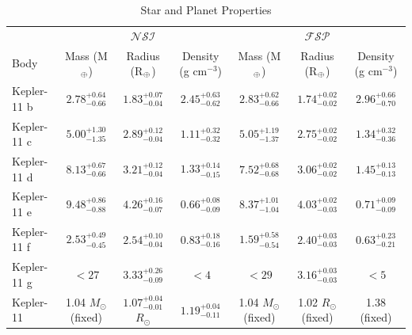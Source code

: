\documentclass[twocolumn,trackchanges]{aastex61}
\begin{document}
\begin{table}
\caption{Star and Planet Properties}
\label{table:den}
\centering 
\begin{tabular}{l | c c c | c c c} 
\hline
 & & $\mathcal{NSI}$ & & & $\mathcal{FSP}$ &  \\
Body & Mass (M$_\oplus$) & Radius (R$_\oplus$) & Density (g cm$^{-3}$) & Mass (M$_\oplus$) & Radius (R$_\oplus$) & Density (g cm$^{-3}$) \\
\hline
Kepler-11 b & $2.78^{+0.64}_{-0.66}$ & $1.83^{+0.07}_{-0.04} $ & $2.45^{+0.63}_{-0.62} $ & $2.83^{+0.62}_{-0.66}$ & $1.74^{+0.02}_{-0.02}$ & $ 2.96^{+0.66}_{-0.70} $  \\
Kepler-11 c & $5.00^{+1.30}_{-1.35}$ & $2.89^{+0.12}_{-0.04}$ & $1.11^{+0.32}_{-0.32}$ & $5.05^{+1.19}_{-1.37}$ & $2.75^{+0.02}_{-0.02}$ & $ 1.34^{+0.32}_{-0.36} $ \\
Kepler-11 d & $8.13^{+0.67}_{-0.66}$ & $3.21^{+0.12}_{-0.04}$ & $ 1.33^{+0.14}_{-0.15} $ & $7.52^{+0.68}_{-0.68}$ & $3.06^{+0.02}_{-0.02}$ & $ 1.45^{+0.13}_{-0.13} $ \\
Kepler-11 e & $9.48^{+0.86}_{-0.88}$ & $4.26^{+0.16}_{-0.07}$ &  $ 0.66^{+0.08}_{-0.09} $ & $8.37^{+1.01}_{-1.04}$ & $4.03^{+0.02}_{-0.03}$ & $ 0.71^{+0.09}_{-0.09} $ \\
Kepler-11 f & $2.53^{+0.49}_{-0.45}$ & $2.54^{+0.10}_{-0.04}$ & $ 0.83^{+0.18}_{-0.16} $  & $1.59^{+0.58}_{-0.54}$ & $2.40^{+0.03}_{-0.03}$ & $ 0.63^{+0.23}_{-0.21} $  \\
Kepler-11 g & $ <  27$ & $3.33^{+0.26}_{-0.09}$ & $ <  4 $ & $<  29$ & $3.16^{+0.03}_{-0.03}$ & $ < 5 $\\
\hline    
Kepler-11  & 1.04 $M_{\odot}$ (fixed) & $1.07^{+0.04}_{-0.01}$ $R_{\odot}$ & $1.19^{+0.04}_{-0.11}$  & 1.04 $M_{\odot}$ (fixed) & 1.02 $R_{\odot}$ (fixed) & 1.38 (fixed) \\
\hline   
\end{tabular}

\end{table}
\end{document}
